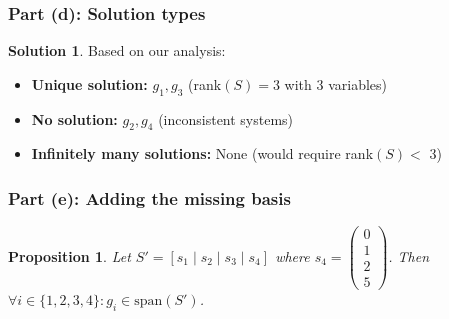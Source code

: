\documentclass[12pt]{article}
\newtheorem{proposition}{Proposition}
\theoremstyle{definition}
\newtheorem{solution}{Solution}
\begin{document}
\subsubsection*{Part (d): Solution types}

\begin{solution}
Based on our analysis:

\begin{itemize}
\item \textbf{Unique solution:} $g_1, g_3$ (rank$(S) = 3$ with 3 variables)
\item \textbf{No solution:} $g_2, g_4$ (inconsistent systems)
\item \textbf{Infinitely many solutions:} None (would require rank$(S) <$ 3)
\end{itemize}
\end{solution}

\subsubsection*{Part (e): Adding the missing basis}

\begin{proposition}
Let $S' = [s_1 \mid s_2 \mid s_3 \mid s_4]$ where $s_4 = \begin{pmatrix} 0 \\ 1 \\ 2 \\ 5 \end{pmatrix}$. Then $\forall i \in \{1,2,3,4\}: g_i \in \text{span}(S')$.
\end{proposition}
\end{document}
